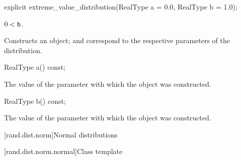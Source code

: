 %
\begin{itemdecl}
explicit extreme_value_distribution(RealType a = 0.0, RealType b = 1.0);
\end{itemdecl}

\begin{itemdescr}
\pnum\requires
 $ 0 < \texttt{\protect b} $.

\pnum\effects Constructs an  object;
  and 
 correspond to the respective parameters of the distribution.
\end{itemdescr}

%
\begin{itemdecl}
RealType a() const;
\end{itemdecl}

\begin{itemdescr}
\pnum\returns The value of the  parameter
 with which the object was constructed.
\end{itemdescr}

%
\begin{itemdecl}
RealType b() const;
\end{itemdecl}

\begin{itemdescr}
\pnum\returns The value of the  parameter
 with which the object was constructed.
\end{itemdescr}%
%



[rand.dist.norm]{Normal distributions}%
%


[rand.dist.norm.normal]{Class template }%
%
%

